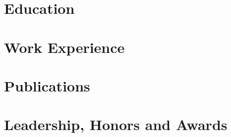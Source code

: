 \documentclass[letter,10pt]{article}
\begin{document}


\section{Education}


\section{Work Experience}


\section{Publications}


% 
\thispagestyle{empty}
\setlength{\headheight}{50pt}
\setlength{\headsep}{0pt}
% 

\section{Leadership, Honors and Awards}


\end{document}
